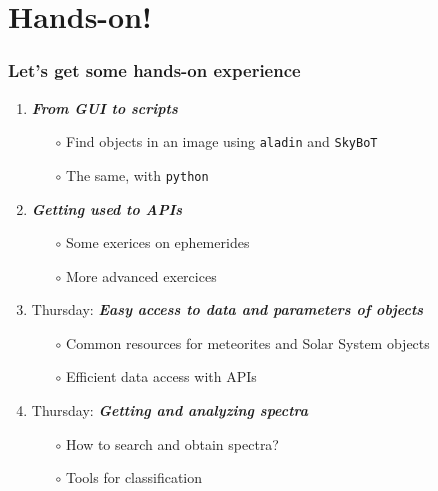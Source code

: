\section{Hands-on!}


\begin{frame}
  \frametitle{Let's get some hands-on experience}

  \begin{enumerate}[<.->]
    \item \emph{\bf From GUI to scripts}
      \begin{itemize}[<.->]
        \item[$\circ$] Find objects in an image using \texttt{aladin} and \texttt{SkyBoT}
        \item[$\circ$] The same, with \texttt{python}
      \end{itemize}
  
    \vspace{0.5em}
  \item \emph{\bf Getting used to APIs}
      \begin{itemize}[<.->]
        \item[$\circ$] Some exerices on ephemerides 
        \item[$\circ$] More advanced exercices 
      \end{itemize}
 
    \vspace{0.5em}
  \item Thursday: \emph{\bf Easy access to data and parameters of objects}
      \begin{itemize}[<.->]
        \item[$\circ$] Common resources for meteorites and Solar System objects
        \item[$\circ$] Efficient data access with APIs
      \end{itemize}
  
    \vspace{0.5em}
    \item Thursday: \emph{\bf Getting and analyzing spectra}
      \begin{itemize}[<.->]
        \item[$\circ$] How to search and obtain spectra?
        \item[$\circ$] Tools for classification
      \end{itemize}

  \end{enumerate}

 \end{frame}
